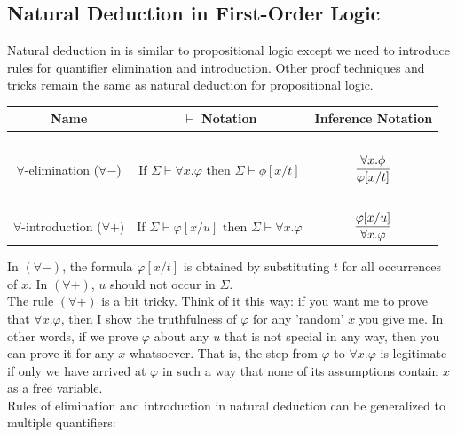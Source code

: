 \documentclass[english, 11pt]{article}
\begin{document}
  \subsection{Natural Deduction in First-Order Logic}

  Natural deduction in  is similar to propositional logic except we need to introduce rules for quantifier elimination and introduction. Other proof techniques and tricks remain the same as natural deduction for propositional logic.

 \begin{center}
    \begin{tabular}{c | c | c }
      Name & $\vdash$ Notation & Inference Notation \\
      \hline
      \hline
      \ &&\\
      $\forall$-elimination ($\forall -$) & If $\Sigma \vdash \forall x. \varphi$ then $\Sigma \vdash \phi[x/t]$ & $\displaystyle{\frac{\forall x. \phi}{\varphi[x/t]}}$ \\[3ex]
      \hline
      \hline
      \ &&\\
      $\forall$-introduction ($\forall +$) & If $\Sigma \vdash \varphi[x/u]$ then $\Sigma \vdash \forall x . \varphi$ & $\displaystyle \frac{\varphi[x/u]}{\forall x. \varphi}$ \\[3ex]
      \hline
      \hline
    \end{tabular}
    \end{center}
    In $(\forall -)$, the formula $\varphi[x/t]$ is obtained by substituting $t$ for all occurrences of $x$. In $(\forall +)$, $u$ should not occur in $\Sigma$. \\

    The rule $(\forall +)$ is a bit tricky. Think of it this way: if you want me to prove that $\forall x. \varphi$, then I show the truthfulness of $\varphi$ for any 'random' $x$ you give me. In other words, if we prove $\varphi$ about any $u$ that is not special in any way, then you can prove it for any $x$ whatsoever. That is, the step from $\varphi$ to $\forall x. \varphi$ is legitimate if only we have arrived at $\varphi$ in such a way that none of its assumptions contain $x$ as a free variable. \\

    Rules of elimination and introduction in  natural deduction can be generalized to multiple quantifiers:
\end{document}
